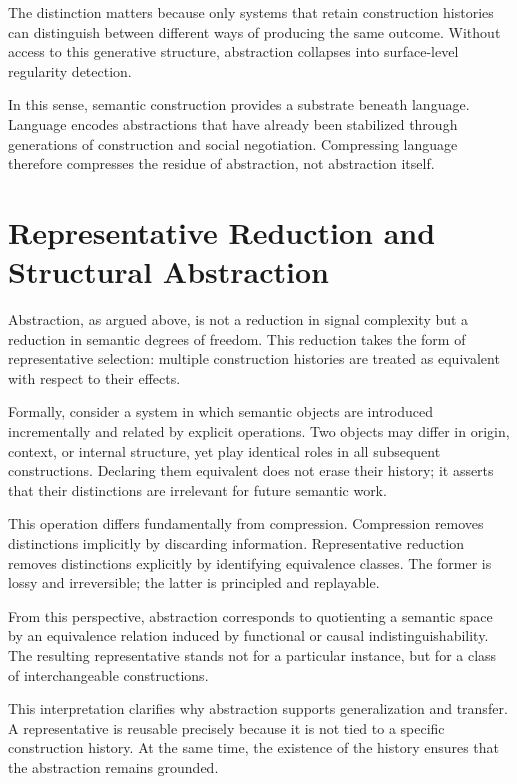 \documentclass[11pt]{article}
\begin{document}
The distinction matters because only systems that retain construction
histories can distinguish between different ways of producing the same
outcome. Without access to this generative structure, abstraction collapses
into surface-level regularity detection.

In this sense, semantic construction provides a substrate beneath
language. Language encodes abstractions that have already been stabilized
through generations of construction and social negotiation. Compressing
language therefore compresses the residue of abstraction, not abstraction
itself.

\section{Representative Reduction and Structural Abstraction}

Abstraction, as argued above, is not a reduction in signal complexity but a
reduction in semantic degrees of freedom. This reduction takes the form of
representative selection: multiple construction histories are treated as
equivalent with respect to their effects.

Formally, consider a system in which semantic objects are introduced
incrementally and related by explicit operations. Two objects may differ
in origin, context, or internal structure, yet play identical roles in all
subsequent constructions. Declaring them equivalent does not erase their
history; it asserts that their distinctions are irrelevant for future
semantic work.

This operation differs fundamentally from compression. Compression removes
distinctions implicitly by discarding information. Representative
reduction removes distinctions explicitly by identifying equivalence
classes. The former is lossy and irreversible; the latter is principled and
replayable.

From this perspective, abstraction corresponds to quotienting a semantic
space by an equivalence relation induced by functional or causal
indistinguishability. The resulting representative stands not for a
particular instance, but for a class of interchangeable constructions.

This interpretation clarifies why abstraction supports generalization and
transfer. A representative is reusable precisely because it is not tied to
a specific construction history. At the same time, the existence of the
history ensures that the abstraction remains grounded.
\end{document}
